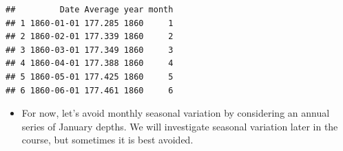 \documentclass[]{article}
\newenvironment{Shaded}{\begin{snugshade}}{\end{snugshade}}
\newcommand{\KeywordTok}[1]{\textcolor[rgb]{0.13,0.29,0.53}{\textbf{#1}}}
\newcommand{\DataTypeTok}[1]{\textcolor[rgb]{0.13,0.29,0.53}{#1}}
\newcommand{\DecValTok}[1]{\textcolor[rgb]{0.00,0.00,0.81}{#1}}
\newcommand{\StringTok}[1]{\textcolor[rgb]{0.31,0.60,0.02}{#1}}
\newcommand{\OtherTok}[1]{\textcolor[rgb]{0.56,0.35,0.01}{#1}}
\newcommand{\OperatorTok}[1]{\textcolor[rgb]{0.81,0.36,0.00}{\textbf{#1}}}
\newcommand{\NormalTok}[1]{#1}
\providecommand{\tightlist}{%
  \setlength{\itemsep}{0pt}\setlength{\parskip}{0pt}}
\begin{document}
\begin{Shaded}
\end{Shaded}

\begin{verbatim}
##         Date Average year month
## 1 1860-01-01 177.285 1860     1
## 2 1860-02-01 177.339 1860     2
## 3 1860-03-01 177.349 1860     3
## 4 1860-04-01 177.388 1860     4
## 5 1860-05-01 177.425 1860     5
## 6 1860-06-01 177.461 1860     6
\end{verbatim}

\begin{itemize}
\tightlist
\item
  For now, let's avoid monthly seasonal variation by considering an
  annual series of January depths. We will investigate seasonal
  variation later in the course, but sometimes it is best avoided.
\end{itemize}

\begin{Shaded}
\end{Shaded}
\end{document}
